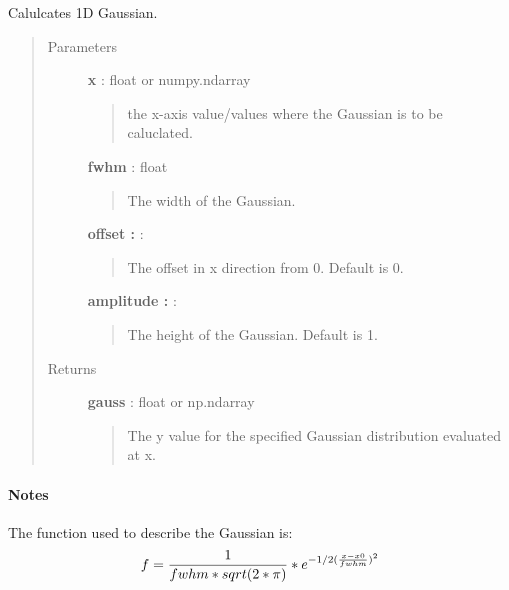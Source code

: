 \documentclass[a4paper,10pt,english]{sphinxmanual}
\begin{document}
\begin{fulllineitems}
\label{functions:astrolyze.functions.astro_functions.gauss1D}
Calulcates 1D Gaussian.
\begin{quote}\begin{description}
\item[{Parameters }] \leavevmode
\textbf{x} : float or numpy.ndarray
\begin{quote}

the x-axis value/values where the Gaussian is to be caluclated.
\end{quote}

\textbf{fwhm} : float
\begin{quote}

The width of the Gaussian.
\end{quote}

\textbf{offset :} :
\begin{quote}

The offset in x direction from 0. Default is 0.
\end{quote}

\textbf{amplitude :} :
\begin{quote}

The height of the Gaussian. Default is 1.
\end{quote}

\item[{Returns }] \leavevmode
\textbf{gauss} : float or np.ndarray
\begin{quote}

The y value for the specified Gaussian distribution evaluated at x.
\end{quote}

\end{description}\end{quote}
\paragraph{Notes}

The function used to describe the Gaussian is:
\begin{gather}
\begin{split}f = \frac{1}{fwhm * sqrt(2 * \pi)} * e^{-1/2 (\frac{x-x0}{fwhm})^2}\end{split}\notag
\end{gather}
\end{fulllineitems}
\end{document}
